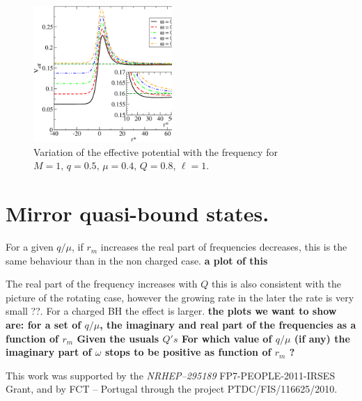 \documentclass[aps, prd, twocolumn, amsmath, floats,floatfix, superscriptaddress,
nofootinbib, showpacs]{revtex4-1}
\begin{document}
\begin{figure}[!ht]
\includegraphics[width=0.47\textwidth]{m0.4_Q0.8_q0.5_ws.eps}
\caption{Variation of the effective potential with the frequency for $M=1,\,q=0.5,\,
\mu=0.4 ,\, Q=0.8$, $\ell=1$.}
\label{fig:pot_w}
\end{figure}

\section{Mirror quasi-bound states.}
\label{sec:Mbound-states}
For a given $q/\mu$, if $r_m$ increases the real part of frequencies decreases, this is
the same behaviour than in the non charged case.
{\bf a plot of this}

The real part of the frequency increases with $Q$ this is also consistent with the picture
of the rotating case, however the growing rate in the later the rate is very small ??. For
a charged BH the effect is larger. 
{\bf the plots we want to show are:
for a set of $q/\mu$, the imaginary and real part of the frequencies as a function of
$r_{m}$
Given the usuals $Q's$ 
For which value of $q/\mu$ (if any) the imaginary part of $\omega$ stops to be positive
as function of $r_{m}$ ?
}




  This work was supported by the {\it NRHEP--295189} FP7-PEOPLE-2011-IRSES Grant, and by
  FCT -- Portugal through the project PTDC/FIS/116625/2010.







\end{document}
